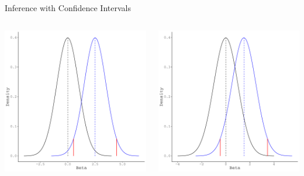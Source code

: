 \documentclass[10pt]{beamer}\usepackage[]{graphicx}\usepackage[]{color}
\makeatletter
\def\maxwidth{ %
  \ifdim\Gin@nat@width>\linewidth
    \linewidth
  \else
    \Gin@nat@width
  \fi
}
\newenvironment{knitrout}{}{} %
\makeatother
\begin{document}
{\begin{frame}{Inference with Confidence Intervals}
\begin{columns}
\begin{column}{0.5\textwidth}
\begin{knitrout}
{\centering \includegraphics[width=\maxwidth]{figure/unnamed-chunk-22-1} 

}


\end{knitrout}

\end{column}
\begin{column}{0.5\textwidth}
  
\begin{knitrout}\footnotesize
{}\color{fgcolor}

{\centering \includegraphics[width=\maxwidth]{figure/unnamed-chunk-23-1} 

}
\end{knitrout}
\end{column}
\end{columns}
\end{frame}}
\end{document}
